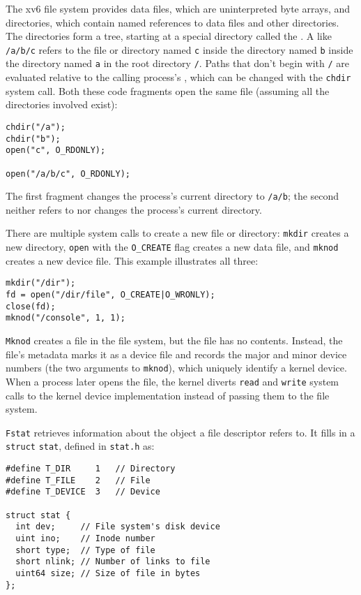 The xv6 file system provides data files,
which are uninterpreted byte arrays,
and directories, which
contain named references to data files and other directories.
The directories form a tree, starting
at a special directory called the 
.
A 
like
\lstinline{/a/b/c}
refers to the file or directory named
\lstinline{c}
inside the directory named
\lstinline{b}
inside the directory named
\lstinline{a}
in the root directory
\lstinline{/}.
Paths that don't begin with
\lstinline{/}
are evaluated relative to the calling process's
,
which can be changed with the
\lstinline{chdir}
system call.
Both these code fragments open the same file
(assuming all the directories involved exist):
\begin{lstlisting}[]
chdir("/a");
chdir("b");
open("c", O_RDONLY);

open("/a/b/c", O_RDONLY);
\end{lstlisting}
The first fragment changes the process's current directory to
\lstinline{/a/b};
the second neither refers to nor changes the process's current directory.

There are multiple system calls to create a new file or directory:
\lstinline{mkdir}
creates a new directory,
\lstinline{open}
with the
\lstinline{O_CREATE}
flag creates a new data file,
and
\lstinline{mknod}
creates a new device file.
This example illustrates all three:
\begin{lstlisting}[]
mkdir("/dir");
fd = open("/dir/file", O_CREATE|O_WRONLY);
close(fd);
mknod("/console", 1, 1);
\end{lstlisting}
\lstinline{Mknod}
creates a file in the file system,
but the file has no contents.
Instead, the file's metadata marks it as a device file
and records the major and minor device numbers
(the two arguments to 
\lstinline{mknod}),
which uniquely identify a kernel device.
When a process later opens the file, the kernel
diverts
\lstinline{read}
and
\lstinline{write}
system calls to the kernel device implementation
instead of passing them to the file system.

\lstinline{Fstat}
retrieves information about the object a file
descriptor refers to.
It fills in a
\lstinline{struct}
\lstinline{stat},
defined in
\lstinline{stat.h} 
as:
\begin{lstlisting}[]
#define T_DIR     1   // Directory
#define T_FILE    2   // File
#define T_DEVICE  3   // Device

struct stat {
  int dev;     // File system's disk device
  uint ino;    // Inode number
  short type;  // Type of file
  short nlink; // Number of links to file
  uint64 size; // Size of file in bytes
};
\end{lstlisting}

